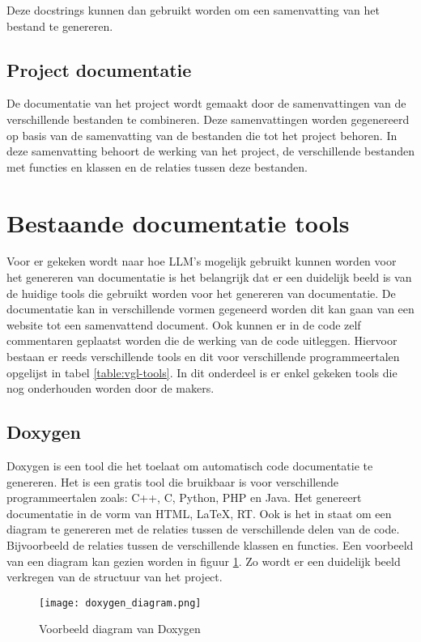 Deze docstrings kunnen dan gebruikt worden om een samenvatting van het bestand te genereren.

\subsection{Project documentatie}
\label{sec:project-documentatie-literatuur}
De documentatie van het project wordt gemaakt door de samenvattingen van de verschillende bestanden te combineren.
Deze samenvattingen worden gegenereerd op basis van de samenvatting van de bestanden die tot het project behoren.
In deze samenvatting behoort de werking van het project, de verschillende bestanden met functies en klassen en de relaties tussen deze bestanden.


\section{Bestaande documentatie tools}
\label{sec:huidige-tools}
Voor er gekeken wordt naar hoe LLM's mogelijk gebruikt kunnen worden voor het genereren van documentatie is het belangrijk dat er een duidelijk beeld is van de huidige tools die gebruikt worden voor het genereren van documentatie.
De documentatie kan in verschillende vormen gegeneerd worden dit kan gaan van een website tot een samenvattend document.
Ook kunnen er in de code zelf commentaren geplaatst worden die de werking van de code uitleggen.
Hiervoor bestaan er reeds verschillende tools en dit voor verschillende programmeertalen opgelijst in tabel \ref{table:vgl-tools}.
In dit onderdeel is er enkel gekeken tools die nog onderhouden worden door de makers. 

\subsection{Doxygen}
Doxygen \autocite{Doxygen2023} is een tool die het toelaat om automatisch code documentatie te genereren. Het is een gratis tool die bruikbaar is voor verschillende programmeertalen zoals: C++, C, Python, PHP en Java.
Het genereert documentatie in de vorm van HTML, LaTeX, RT. Ook is het in staat om een diagram te genereren met de relaties tussen de verschillende delen van de code. 
Bijvoorbeeld de relaties tussen de verschillende klassen en functies.
Een voorbeeld van een diagram kan gezien worden in figuur \ref{fig:Doxygen-diagram}.
Zo wordt er een duidelijk beeld verkregen van de structuur van het project.

\begin{figure}[h]
  \centering
  \texttt{[image: doxygen\_diagram.png]}
  \caption{Voorbeeld diagram van Doxygen \autocite{Doxygen2023}}
  \label{fig:Doxygen-diagram}
\end{figure}


